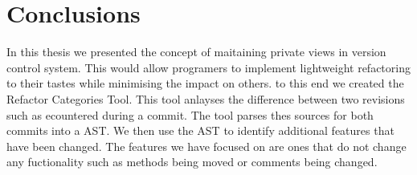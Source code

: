 
\chapter{Conclusions}\label{C:con}

In this thesis we presented the concept of maitaining private views in version control system. This would allow programers to implement lightweight refactoring to their tastes while minimising the impact on others.  to this end we created the Refactor Categories Tool. This tool anlayses the difference between two revisions such as ecountered during a commit.  The tool parses thes sources for both commits into a AST. We then use the AST to identify additional features that have been changed. The features we have focused on are ones that do not change any fuctionality such as methods being moved or comments being changed.
